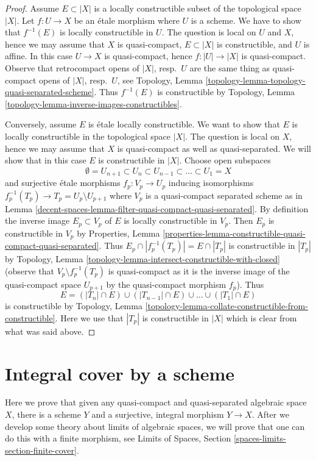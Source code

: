 \begin{proof}
Assume $E \subset |X|$ is a locally constructible subset of
the topological space $|X|$. Let $f : U \to X$ be an
\'etale morphism where $U$ is a scheme. We have to show that
$f^{-1}(E)$ is locally constructible in $U$. The question is
local on $U$ and $X$, hence we may assume that $X$ is quasi-compact,
$E \subset |X|$ is constructible, and $U$ is affine.
In this case $U \to X$ is quasi-compact, hence
$f : |U| \to |X|$ is quasi-compact. Observe that retrocompact
opens of $|X|$, resp.\ $U$ are the same thing as quasi-compact opens
of $|X|$, resp.\ $U$, see
Topology, Lemma \ref{topology-lemma-topology-quasi-separated-scheme}.
Thus $f^{-1}(E)$ is constructible by Topology, Lemma
\ref{topology-lemma-inverse-images-constructibles}.

\medskip\noindent
Conversely, assume $E$ is \'etale locally constructible.
We want to show that $E$ is locally constructible in the
topological space $|X|$.
The question is local on $X$, hence we may assume that $X$ is
quasi-compact as well as quasi-separated. We will show that
in this case $E$ is constructible in $|X|$.
Choose open subspaces
$$
\emptyset = U_{n + 1} \subset
U_n \subset U_{n - 1} \subset \ldots \subset U_1 = X
$$
and surjective \'etale morphisms $f_p : V_p \to U_p$
inducing isomorphisms $f_p^{-1}(T_p) \to T_p = U_p \setminus U_{p + 1}$
where $V_p$ is a quasi-compact separated scheme as in
Lemma \ref{decent-spaces-lemma-filter-quasi-compact-quasi-separated}.
By definition the inverse image $E_p \subset V_p$ of $E$ is
locally constructible in $V_p$. Then $E_p$ is constructible in $V_p$
by Properties, Lemma
\ref{properties-lemma-constructible-quasi-compact-quasi-separated}.
Thus $E_p \cap |f_p^{-1}(T_p)| = E \cap |T_p|$ is constructible
in $|T_p|$ by
Topology, Lemma \ref{topology-lemma-intersect-constructible-with-closed}
(observe that $V_p \setminus f_p^{-1}(T_p)$ is quasi-compact as it is the
inverse image of the quasi-compact space $U_{p + 1}$ by the
quasi-compact morphism $f_p$).
Thus
$$
E = (|T_n| \cap E) \cup (|T_{n - 1}| \cap E) \cup \ldots \cup
(|T_1| \cap E)
$$
is constructible by
Topology, Lemma \ref{topology-lemma-collate-constructible-from-constructible}.
Here we use that $|T_p|$ is constructible in $|X|$ which is clear from
what was said above.
\end{proof}

\section{Integral cover by a scheme}
\label{decent-spaces-section-integral-cover}
Here we prove that given any quasi-compact and quasi-separated
algebraic space $X$, there is a scheme $Y$ and a surjective, integral
morphism $Y \to X$. After we develop some theory about limits of
algebraic spaces, we will prove that one can do this with a finite
morphism, see
Limits of Spaces, Section \ref{spaces-limits-section-finite-cover}.

